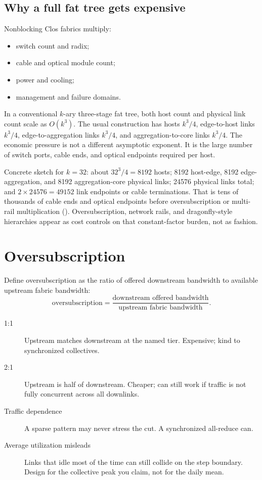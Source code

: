 \subsection{Why a full fat tree gets expensive}
\label{sec:hpc-fattree-cost}

Nonblocking Clos fabrics multiply:

\begin{itemize}
\item switch count and radix;
\item cable and optical module count;
\item power and cooling;
\item management and failure domains.
\end{itemize}

In a conventional $k$-ary three-stage fat tree, both host count and physical
link count scale as $O(k^3)$. The usual construction has hosts $k^3/4$,
edge-to-host links $k^3/4$, edge-to-aggregation links $k^3/4$, and
aggregation-to-core links $k^3/4$. The economic pressure is not a different
asymptotic exponent. It is the large number of switch ports, cable ends, and
optical endpoints required per host.

Concrete sketch for $k=32$: about $32^3/4 = 8192$ hosts; 8192 host-edge,
8192 edge-aggregation, and 8192 aggregation-core physical links; 24576
physical links total; and $2\times 24576 = 49152$ link endpoints or cable
terminations. That is tens of thousands of cable ends and optical endpoints
before oversubscription or multi-rail multiplication
(). Oversubscription, network rails, and dragonfly-style
hierarchies appear as cost controls on that constant-factor burden, not as
fashion.

\section{Oversubscription}
\label{sec:hpc-oversub}

Define oversubscription as the ratio of offered downstream bandwidth to
available upstream fabric bandwidth:
\begin{equation}
\text{oversubscription}
=
\frac{\text{downstream offered bandwidth}}
{\text{upstream fabric bandwidth}}.
\label{eq:oversub}
\end{equation}

\begin{description}
\item[1:1] Upstream matches downstream at the named tier. Expensive; kind to
      synchronized collectives.
\item[2:1] Upstream is half of downstream. Cheaper; can still work if traffic
      is not fully concurrent across all downlinks.
\item[Traffic dependence] A sparse pattern may never stress the cut. A
      synchronized all-reduce can.
\item[Average utilization misleads] Links that idle most of the time can still
      collide on the step boundary. Design for the collective peak you claim,
      not for the daily mean.
\end{description}

